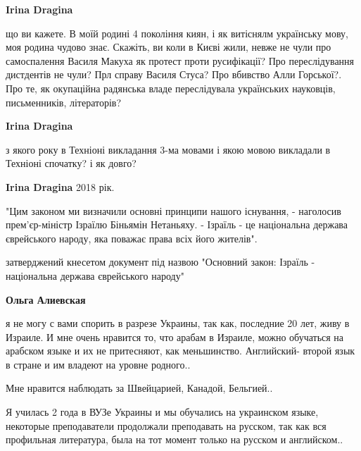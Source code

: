 \begin{itemize}
\begin{itemize}
\textbf{Irina Dragina} 

що ви кажете. В моїй родині 4 покоління киян, і як витіснялм українську мову,
моя родина чудово знає. Скажіть, ви коли в Києві жили, невже не чули про
самоспалення Василя Макуха як протест проти русифікації? Про переслідування
дистдентів не чули? Прл справу Василя Стуса? Про вбивство Алли Горської?. Про
те, як окупаційна радянська владе переслідувала українських науковців,
письменників, літераторів?


 
\textbf{Irina Dragina} 

з якого року в Техніоні викладання 3-ма мовами і якою мовою викладали в
Техніоні спочатку? і як довго?

 
\textbf{Irina Dragina} 2018 рік. 

"Цим законом ми визначили основні принципи нашого існування, - наголосив
прем'єр-міністр Ізраїлю Біньямін Нетаньяху. - Ізраїль - це національна держава
єврейського народу, яка поважає права всіх його жителів".

затверджений кнесетом документ під назвою "Основний закон: Ізраїль -
національна держава єврейського народу"


 
\textbf{Ольга Алиевская} 

я не могу с вами спорить в разрезе Украины, так как, последние 20 лет, живу в
Израиле. И мне очень нравится то, что арабам в Израиле, можно обучаться на
арабском языке и их не притесняют, как меньшинство. Английский- второй язык в
стране и им владеют на уровне родного..

Мне нравится наблюдать за Швейцарией, Канадой, Бельгией..

Я училась 2 года в ВУЗе Украины и мы обучались на украинском языке, некоторые
преподаватели продолжали преподавать на русском, так как вся профильная
литература, была на тот момент только на русском и английском..


\end{itemize}
\end{itemize}
